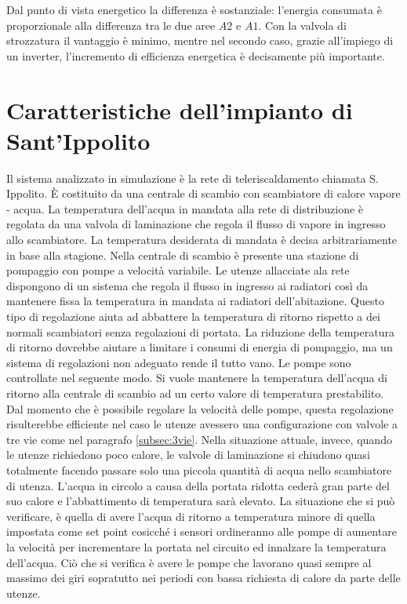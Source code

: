 \documentclass[laurea,oneside,11pt]{USiena_tesiLM}
\begin{document}
Dal punto di vista energetico la differenza è sostanziale: l'energia consumata è proporzionale alla differenza tra le due aree $A2$ e $A1$. Con la valvola di strozzatura il vantaggio è minimo, mentre nel secondo caso, grazie all'impiego di un inverter, l'incremento di efficienza energetica è decisamente più importante.


\section{Caratteristiche dell'impianto di Sant'Ippolito}
Il sistema analizzato in simulazione è la rete di teleriscaldamento chiamata S. Ippolito. \`E costituito da una centrale di scambio con scambiatore di calore vapore - acqua. La temperatura dell'acqua in mandata alla rete di distribuzione è regolata da una valvola di laminazione che regola il flusso di vapore in ingresso allo scambiatore. La temperatura desiderata di mandata è decisa arbitrariamente in base alla stagione. Nella centrale di scambio è presente una stazione di pompaggio con pompe a velocità variabile.
Le utenze allacciate ala rete dispongono di un sistema che regola il flusso in ingresso ai radiatori così da mantenere fissa la temperatura in mandata ai radiatori dell'abitazione. Questo tipo di regolazione aiuta ad abbattere la temperatura di ritorno rispetto a dei normali  scambiatori senza regolazioni di portata. La riduzione della temperatura di ritorno dovrebbe aiutare a limitare i consumi di energia di pompaggio, ma un sistema di regolazioni non adeguato rende il tutto vano. Le pompe sono controllate nel seguente modo. Si vuole mantenere la temperatura dell'acqua di ritorno alla centrale di scambio ad un certo valore di temperatura prestabilito. Dal momento che è possibile regolare la velocità delle pompe, questa regolazione   risulterebbe efficiente nel caso le utenze avessero una configurazione con valvole a tre vie come nel paragrafo \ref{subsec:3vie}. Nella situazione attuale, invece, quando le utenze richiedono poco calore, le valvole di laminazione si chiudono quasi totalmente facendo passare solo una piccola quantità di acqua nello scambiatore di utenza. L'acqua in circolo a causa della portata ridotta cederà gran parte del suo calore e l'abbattimento di temperatura sarà elevato. La situazione che si può verificare, è quella di avere l'acqua di ritorno a temperatura minore di quella impostata come set point cosicché i sensori ordineranno alle pompe di aumentare la velocità per incrementare la portata  nel circuito ed innalzare la temperatura dell'acqua. Ciò che si verifica è avere le pompe che lavorano quasi sempre al massimo dei giri sopratutto nei periodi con bassa richiesta di calore da parte delle utenze.
\end{document}
